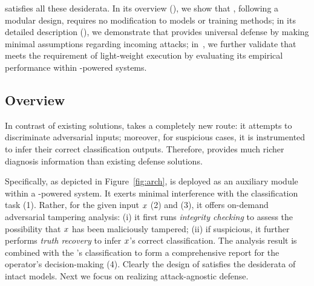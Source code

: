 %

\system satisfies all these desiderata. In its overview (), we show that \system, following a modular design, requires no modification to \dnn models or training methods; in its detailed description (), we demonstrate that \system provides universal defense by making minimal assumptions regarding incoming attacks; in~, we further validate that \system meets the requirement of light-weight execution by evaluating its empirical performance within \dl-powered systems.


\subsection{Overview}
\label{sec:overview}

In contrast of existing solutions, \system takes a completely new route: it attempts to discriminate adversarial inputs; moreover, for suspicious cases, it is instrumented to infer their correct classification outputs. Therefore, \system provides much richer diagnosis information than existing defense solutions.




Specifically, as depicted in Figure~\ref{fig:arch}, \system is deployed as an auxiliary module within a \dl-powered system. It exerts minimal interference with the classification task (1). Rather, for the given input $x$ (2) and \dnn (3), it offers on-demand adversarial tampering analysis: (i) it first runs {\em integrity checking} to assess the possibility that $x$ has been maliciously tampered; (ii) if suspicious, it further performs {\em truth recovery} to infer $x$'s correct classification. The analysis result is combined with the \dnn's classification to form a comprehensive report for the operator's decision-making (4). Clearly the design of \system satisfies the desiderata of intact \dnn models. Next we focus on realizing attack-agnostic defense.


